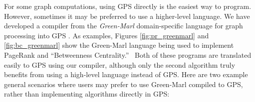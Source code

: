 \begin{comment}
\begin{figure}[t]
\begin{lstlisting}
Procedure bc_approx(G:Graph, BC:Node_Prop<Float>) {
  G.BC = 0;   // Initialize BC as 0 per each node
  Node_Prop<Float> sigma, delta;
  G.sigma = 0;
  Node s = G.PickRandom();   #\label{code:bc:1}# 
  s.sigma = 1;
  InBFS(v: G.Nodes From s) { // BFS-order traversal #\label{code:bc:2}#
     // Summing over BFS parents
     v.sigma = Sum(w:v.UpNbrs) { w.sigma }; } #\label{code:bc:3}#
  }
  InReverse { // Reverse-BFS order traversal  #\label{code:bc:4}#
    v.delta =  // Summing over BFS children   
       Sum (w:v.DownNbrs) { v.sigma / w.sigma * (1+ w.delta) }; #\label{code:bc:5}#
    v.BC += v.delta;  // accumulate delta into BC }
\end{lstlisting}
    \vspace{-10pt}
\caption{Approximate Betweenness Centrality in Green-Marl.}
 \label{fig:bc_greenmarl}
\end{figure}
\end{comment}
For some graph computations, using GPS directly is the easiest way to program.
However, sometimes it may be preferred to use a higher-level language.
We have developed a compiler from the {\em Green-Marl} domain-specific language for graph processing into GPS \cite{hong:gm-to-gps-tech-report}.
As examples, Figures \ref{fig:pr_greenmarl} and \ref{fig:bc_greenmarl} show the Green-Marl language being used to implement PageRank and ``Betweenness Centrality.''~\cite{brandes:bc}
Both of these programs are translated easily to GPS using our compiler, although only the second algorithm truly benefits from using a high-level language instead of GPS.
Here are two example general scenarios where users may prefer to use Green-Marl compiled to GPS, rather than implementing algorithms directly in GPS: 
